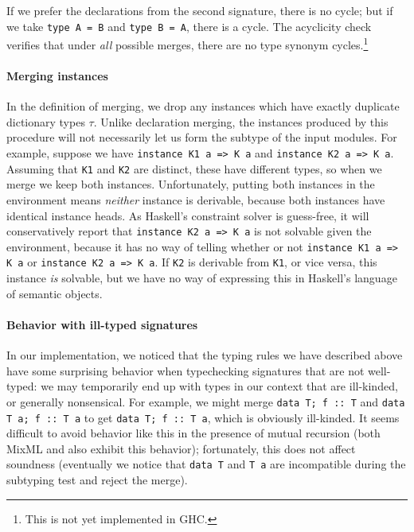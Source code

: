 \vspace{-2em}
\noindent
If we prefer the declarations from the second signature, there is no cycle;
but if we take \verb|type A = B| and \verb|type B = A|, there is a cycle.
The acyclicity check verifies that under \emph{all} possible merges, there
are no type synonym cycles.\footnote{This is not yet implemented in GHC.}

\paragraph{Merging instances}  In the definition of merging, we drop
any instances which have exactly duplicate dictionary types $\tau$.
Unlike declaration merging,
the instances produced by this procedure
will not necessarily let us form the subtype of the input modules.
For example, suppose we have \verb|instance K1 a => K a|
and \verb|instance K2 a => K a|.  Assuming that \verb|K1| and \verb|K2|
are distinct, these have different types, so when we merge we keep
both instances.  Unfortunately, putting both instances in the environment
means \emph{neither} instance is derivable, because both instances have
identical instance heads.  As Haskell's constraint solver is guess-free,
it will conservatively report that \verb|instance K2 a => K a| is not
solvable given the environment, because it has no way of telling whether
or not \verb|instance K1 a => K a| or \verb|instance K2 a => K a|.
If \verb|K2| is derivable from \verb|K1|, or vice versa, this instance
\emph{is} solvable, but we have no way of expressing this in Haskell's
language of semantic objects.

\paragraph{Behavior with ill-typed signatures}  In our implementation,
we noticed that the typing rules we have
described above have some surprising behavior when typechecking signatures that
are not well-typed: we may temporarily end up with types in our context
that are ill-kinded, or generally nonsensical.  For example, we might
merge \verb|data T; f :: T| and \verb|data T a; f :: T a| to get
\verb|data T; f :: T a|, which is obviously ill-kinded.  It seems difficult
to avoid behavior like this in the presence of mutual recursion (both MixML
and \OldBackpack{} also exhibit this behavior); fortunately,
this does not affect soundness (eventually we notice that \verb|data T|
and \verb|T a| are incompatible during the subtyping test and reject the merge).


